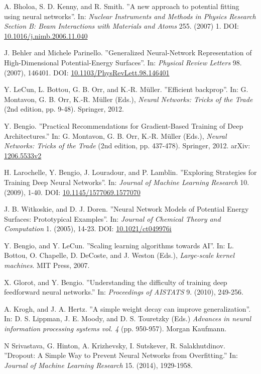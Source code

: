 \documentclass[twoside,english]{uiofysmaster}
\begin{document}
\begin{thebibliography}{56}
 A. Bholoa, S. D. Kenny, and R. Smith.
 ''A new approach to potential fitting using neural networks''.
 In: \textit{Nuclear Instruments and Methods in Physics Research Section B: 
 Beam Interactions with Materials and Atoms} 255. (2007) 1.
 DOI: \href{https://doi.org/10.1016/j.nimb.2006.11.040}{10.1016/j.nimb.2006.11.040}
 
 J. Behler and Michele Parinello. 
 ''Generalized Neural-Network Representation of High-Dimensional Potential-Energy Surfaces''.
 In: \textit{Physical Review Letters} 98. (2007), 146401. 
 DOI: \href{http://dx.doi.org/10.1103/PhysRevLett.98.146401}{10.1103/PhysRevLett.98.146401}
 
 Y. LeCun, L. Bottou, G. B. Orr, and K.-R. Müller.
 ''Efficient backprop''. 
 In: G. Montavon, G. B. Orr, K.-R. Müller (Eds.), \textit{Neural Networks: Tricks of the Trade} (2nd edition, pp. 9-48).
 Springer, 2012. 
 
 Y. Bengio. 
 ''Practical Recommendations for Gradient-Based Training of Deep Architectures.''
 In: G. Montavon, G. B. Orr, K.-R. Müller (Eds.), \textit{Neural Networks: Tricks of the Trade} (2nd edition, pp. 437-478). 
 Springer, 2012. 
 arXiv: \href{arxiv.org/abs/1206.5533v2}{1206.5533v2}
 
 H. Larochelle, Y. Bengio, J. Louradour, and P. Lamblin. 
 ''Exploring Strategies for Training Deep Neural Networks''. 
 In: \textit{Journal of Machine Learning Research} 10. (2009), 1-40. 
 DOI: \href{http://doi.org/10.1145/1577069.1577070}{10.1145/1577069.1577070}
 
 J. B. Witkoskie, and D. J. Doren. 
 ''Neural Network Models of Potential Energy Surfaces: Prototypical Examples''. 
 In: \textit{Journal of Chemical Theory and Computation} 1. (2005), 14-23. 
 DOI: \href{http://doi.org/10.1021/ct049976i}{10.1021/ct049976i}
 
 Y. Bengio, and Y. LeCun. 
 ''Scaling learning algorithms towards AI''. 
 In: L. Bottou, O. Chapelle, D. DeCoste, and J. Weston (Eds.), 
 \textit{Large-scale kernel machines}. MIT Press, 2007. 
 
 X. Glorot, and Y. Bengio. 
 ''Understanding the difficulty of training deep feedforward neural networks.''
 In: \textit{Proceedings of AISTATS} 9. (2010), 249-256. 
 
 A. Krogh, and J. A. Hertz. 
 ''A simple weight decay can improve generalization''.
 In: D. S. Lippman, J. E. Moody, and D. S. Touretzky (Eds.)
 \textit{Advances in neural information processing systems vol. 4} (pp. 950-957). 
 Morgan Kaufmann. 
 
 N Srivastava, G. Hinton, A. Krizhevsky, I. Sutskever, R. Salakhutdinov. 
 ''Dropout: A Simple Way to Prevent Neural Networks from Overfitting.''
 In: \textit{Journal of Machine Learning Research} 15. (2014), 1929-1958. 
 
 
 
\end{thebibliography}
\end{document}
